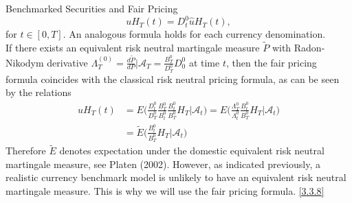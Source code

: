 \documentclass[unknownkeysallowed, compress]{beamer}
\theoremstyle{plain}
\begin{document}
\begin{frame}[allowframebreaks]{Benchmarked Securities and Fair Pricing}
\begin{equation}\label{3.3.8}
uH_T(t) = D^0_t\hat{u}H_T(t),
\end{equation}
for $t\in[0,T]$. An analogous formula holds for each currency denomination.\\
If there exists an equivalent risk neutral martingale measure $\tilde{P}$ with Radon-Nikodym derivative $\Lambda_T^{(0)} = \frac{d\tilde{P}}{dP}\bigg|\mathcal{A}_T = \frac{B_T^0}{D_T^0}D_0^0$ at time $t$, then the fair pricing formula coincides with the classical risk neutral pricing formula, as can be seen by the relations
\begin{equation}\label{3.3.9}
\begin{split}
uH_T(t) &= E\bigg(\frac{D_t^0}{D_T^0}\frac{B_T^0}{B_t^0}\frac{B_t^0}{B_T^0}H_T\bigg|\mathcal{A}_t\bigg) = E\bigg(\frac{\Lambda_T^0}{\Lambda_t^0}\frac{B_t^0}{B_T^0}H_T\bigg|\mathcal{A}_t\bigg) \\
&= \tilde{E}\bigg(\frac{B_t^0}{B_T^0}H_T\bigg|\mathcal{A}_t\bigg)
\end{split}
\end{equation}
Therefore $\tilde{E}$ denotes expectation under the domestic equivalent risk neutral
martingale measure, see Platen (2002). However, as indicated previously, a
realistic currency benchmark model is unlikely to have an equivalent risk neutral
martingale measure. This is why we will use the fair pricing formula. \eqref{3.3.8}
\end{frame}
\end{document}
